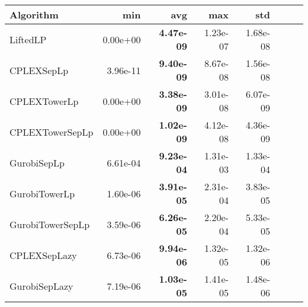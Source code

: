 \begin{tabular}{lrrrrrrr}
Algorithm & min & avg & max & std
\\
\hline
LiftedLP&0.00e+00& \bf4.47e-09& 1.23e-07& 1.68e-08\\
CPLEXSepLp&3.96e-11& \bf9.40e-09& 8.67e-08& 1.56e-08\\
CPLEXTowerLp&0.00e+00& \bf3.38e-09& 3.01e-08& 6.07e-09\\
CPLEXTowerSepLp&0.00e+00& \bf1.02e-09& 4.12e-08& 4.36e-09\\
GurobiSepLp&6.61e-04& \bf9.23e-04& 1.31e-03& 1.33e-04\\
GurobiTowerLp&1.60e-06& \bf3.91e-05& 2.31e-04& 3.83e-05\\
GurobiTowerSepLp&3.59e-06& \bf6.26e-05& 2.20e-04& 5.33e-05\\
CPLEXSepLazy&6.73e-06& \bf9.94e-06& 1.32e-05& 1.32e-06\\
GurobiSepLazy&7.19e-06& \bf1.03e-05& 1.41e-05& 1.48e-06
\end{tabular}
